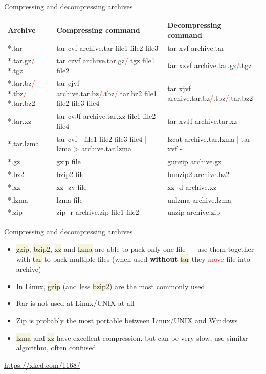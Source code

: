 \documentclass[compress, ucs, xelatex, 11pt, xcolor=svgnames, aspectratio=169,
	hyperref={
		bookmarks=true,
		unicode=true,
		colorlinks=true,
		pdftitle={Linux, command line and MetaCentrum},
		plainpages=false,
		pdfauthor={Vojtech Zeisek},
		pdfsubject={Course about use of Linux command line, writing shell scripts and using MetaCentrum of CESNET},
		pdfcreator={XeLaTeX},
		pdfkeywords={Linux, GNU, BASH, shell, command line, MetaCentrum},
		linkcolor=DarkRed, %
		anchorcolor=DarkBlue, %
		citecolor=Indigo, %
		filecolor=NavyBlue, %
		menucolor=DarkMagenta, %
		urlcolor=DarkBlue, %
		pdftex},
	url={hyphens, lowtilde} %
	]{beamer}
\renewcommand{\texttt}[1]{\colorbox{Beige}{{\ttfamily #1}}}
\renewcommand{\alert}[1]{\textcolor{red}{#1}}
\begin{document}
\begin{frame}{Compressing and decompressing archives}
	\begin{center}
		\begin{tabular}{m{2.25cm}m{6.3cm}m{5.3cm}}
			\textbf{Archive} & \textbf{Compressing command} & \textbf{Decompressing command}\\
			*.tar & tar cvf archive.tar file1 file2 file3 & tar xvf archive.tar\\
			*.tar.gz\alert{/} *.tgz & tar czvf archive.tar.gz\alert{/}.tgz file1 file2 & tar xzvf archive.tar.gz\alert{/}.tgz\\
			*.tar.bz\alert{/} *.tbz\alert{/} *.tar.bz2 & tar cjvf archive.tar.bz\alert{/}.tbz\alert{/}.tar.bz2 file1 file2 file3 file4 & tar xjvf archive.tar.bz\alert{/}.tbz\alert{/}.tar.bz2\\
			*.tar.xz & tar cvJf archive.tar.xz file1 file2 file4 & tar xvJf archive.tar.xz\\
			*.tar.lzma & tar cvf - file1 file2 file3 file4 | lzma > archive.tar.lzma & lzcat archive.tar.lzma | tar xvf -\\
			*.gz & gzip file & gunzip archive.gz\\
			*.bz2 & bzip2 file & bunzip2 archive.bz2\\
			*.xz & xz -zv file & xz -d archive.xz\\
			*.lzma & lzma file & unlzma archive.lzma\\
			*.zip & zip -r archive.zip file1 file2 & unzip archive.zip
		\end{tabular}
	\end{center}
\end{frame}

\begin{frame}{Compressing and decompressing archives}
	\begin{itemize}
		\item \texttt{gzip}, \texttt{bzip2}, \texttt{xz} and \texttt{lzma} are able to pack only one file --- use them together with \texttt{tar} to pack multiple files (when used \textbf{without} \texttt{tar} they \alert{move} file into archive)
		\item In Linux, \texttt{gzip} (and less \texttt{bzip2}) are the most commonly used
		\item Rar is not used at Linux/UNIX at all
		\item Zip is probably the most portable between Linux/UNIX and Windows
		\item \texttt{lzma} and \texttt{xz} have excellent compression, but can be very slow, use similar algorithm, often confused
	\end{itemize}
		\hfill
	\begin{center}
		\texttt{[image: tar.png]}
	\end{center}
	\begin{flushright}
		\url{https://xkcd.com/1168/}
	\end{flushright}
\end{frame}
\end{document}
